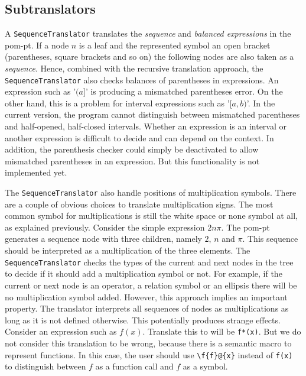 \subsection{Subtranslators}\label{sec:subtranslators}

A \verb|SequenceTranslator| translates the \textit{sequence} and \textit{balanced expressions} in the \gls*{pom-pt}. If a node $n$ is a leaf and the represented symbol an open bracket (parentheses, square brackets and so on) the following nodes are also taken as a \textit{sequence}. Hence, combined with the recursive translation approach, the \verb|SequenceTranslator| also checks balances of parentheses in expressions. An expression such as '$(a]$' is producing a mismatched parentheses error. On the other hand, this is a problem for interval expressions such as '$[a,b)$'. In the current version, the program cannot distinguish between mismatched parentheses and half-opened, half-closed intervals. Whether an expression is an interval or another expression is difficult to decide and can depend on the context. In addition, the parenthesis checker could simply be deactivated to allow mismatched parentheses in an expression. But this functionality is not implemented yet.

The \verb|SequenceTranslator| also handle positions of multiplication symbols. There are a couple of obvious choices to translate multiplication signs. The most common symbol for multiplications is still the white space or none symbol at all, as explained previously. Consider the simple expression $2n\pi$. The \gls*{pom-pt} generates a sequence node with three children, namely $2$, $n$ and $\pi$. This sequence should be interpreted as a multiplication of the three elements. The \verb|SequenceTranslator| checks the types of the current and next nodes in the tree to decide if it should add a multiplication symbol or not. For example, if the current or next node is an operator, a relation symbol or an ellipsis there will be no multiplication symbol added. However, this approach implies an important property. The translator interprets all sequences of nodes as multiplications as long as it is not defined otherwise. This potentially produces strange effects. Consider an expression such as $f(x)$. Translate this to \Maple{} will be \verb|f*(x)|. But we do not consider this translation to be wrong, because there is a semantic macro to represent functions. In this case, the user should use \verb|\f{f}@{x}| instead of \verb|f(x)| to distinguish between $f$ as a function call and $f$ as a symbol.

